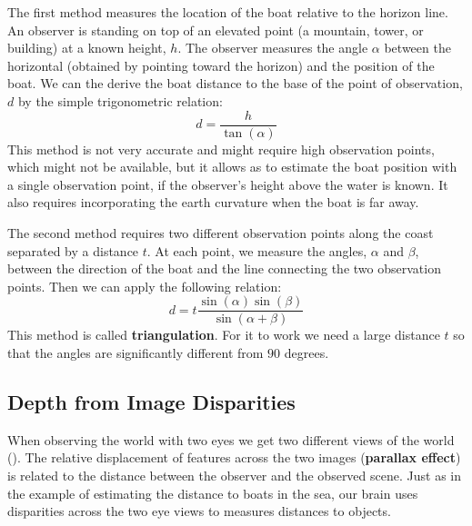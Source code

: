 The first method measures the location of the boat relative to the horizon line. An observer is standing on top of an elevated point (a mountain, tower, or building) at a known height, $h$. The observer measures the angle $\alpha$ between the horizontal (obtained by pointing toward the horizon) and the position of the boat. We can the derive the boat distance to the base of the point of observation, $d$ by the simple trigonometric relation:
\begin{equation}
    d = \frac{h}{\tan (\alpha)}
\end{equation}
This method is not very accurate and might require high observation points, which might not be available, but it allows as to estimate the boat position with a single observation point, if the observer's height above the water is known. It also requires incorporating the earth curvature when the boat is far away.

The second method requires two different observation points along the coast separated by a distance $t$. At each point, we measure the angles, $\alpha$ and $\beta$, between the direction of the boat and the line connecting the two observation points. Then we can apply the following relation:
\begin{equation}
    d = t \frac{\sin (\alpha) \sin (\beta)}{\sin (\alpha+\beta)}
\end{equation}
This method is called {\bf triangulation}. For it to work we need a large distance $t$ so that the angles are significantly different from $90$ degrees.


\subsection{Depth from Image Disparities}

When observing the world with two eyes we get two different views of the world (\fig{\ref{fig:titanic}}). The relative displacement of features across the two images ({\bf parallax effect})
is related to the distance between the observer and the observed scene. Just as in the example of estimating the distance to boats in the sea, our brain uses disparities across the two eye views to measures distances to objects.


